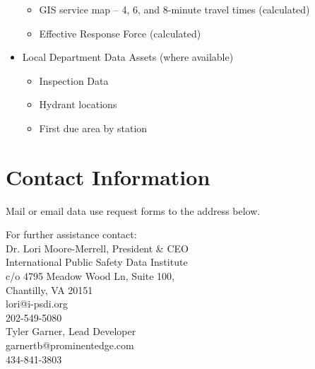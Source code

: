 \documentclass[12pt,oneside]{book}
\begin{document}
\begin{itemize}[noitemsep]
\begin{itemize}[noitemsep]
  \item GIS service map – 4, 6, and 8-minute travel times (calculated)
  \item Effective Response Force (calculated)
  \end{itemize}
\item Local Department Data Assets (where available)
  \begin{itemize}[noitemsep]
  \item Inspection Data
  \item Hydrant locations
  \item First due area by station
  \end{itemize}
\end{itemize}


\chapter{Contact Information}

Mail or email data use request forms to the address below.

For further assistance contact:\\

Dr. Lori Moore-Merrell, President \& CEO \\
International Public Safety Data Institute \\
c/o 4795 Meadow Wood Ln, Suite 100, \\
Chantilly, VA 20151 \\
lori@i-psdi.org \\
202-549-5080 \\


Tyler Garner, Lead Developer \\
garnertb@prominentedge.com \\
434-841-3803 \\



\end{document}
